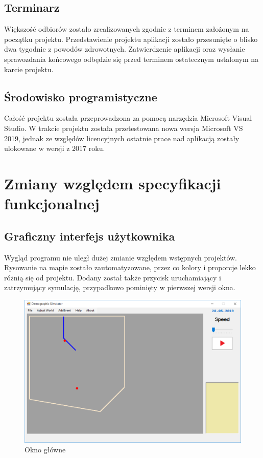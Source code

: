 \documentclass[a4paper,12pt]{article}
\newcommand\tab[1][0.6cm]{\hspace*{#1} }
\begin{document}
\subsection{Terminarz}

\tab Większość odbiorów zostało zrealizowanych zgodnie z terminem założonym na początku projektu. Przedstawienie projektu aplikacji zostało przesunięte o blisko dwa tygodnie z powodów zdrowotnych. Zatwierdzenie aplikacji oraz wysłanie sprawozdania końcowego odbędzie się przed terminem ostatecznym ustalonym na karcie projektu.

\subsection{Środowisko programistyczne}

\tab Całość projektu została przeprowadzona za pomocą narzędzia Microsoft Visual Studio. W trakcie projektu została przetestowana nowa wersja Microsoft VS 2019, jednak ze względów licencyjnych ostatnie prace nad aplikacją zostały ulokowane w wersji z 2017 roku.

\newpage

\section{Zmiany względem specyfikacji funkcjonalnej}


\subsection{Graficzny interfejs użytkownika}

\tab Wygląd programu nie uległ dużej zmianie względem wstępnych projektów. Rysowanie na mapie zostało zautomatyzowane, przez co kolory i proporcje lekko różnią się od projektu. Dodany został także przycisk uruchamiający i zatrzymujący symulację, przypadkowo pominięty w pierwszej wersji okna. 

\begin{figure}[H]
  \centering
  \includegraphics[width=\textwidth]{main}  
  \caption{Okno główne}
  \label{fig:GUI1}
\end{figure}
\end{document}
